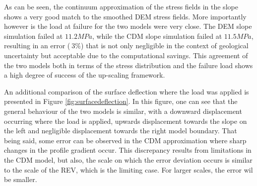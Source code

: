 As can be seen, the continuum approximation of the stress fields in the slope shows a very good match to the smoothed DEM stress fields. More importantly however is the load at failure for the two models were very close. The DEM slope simulation failed at $11.2 MPa$, while the CDM slope simulation failed at $11.5 MPa$, resulting in an error ($~3\%$) that is not only negligible in the context of geological uncertainty but acceptable due to the computational savings. This agreement of the two models both in terms of the stress distribution and the failure load shows a high degree of success of the up-scaling framework. 

An additional comparison of the surface deflection where the load was applied is presented in Figure \ref{fig:surfacedeflection}. In this figure, one can see that the general behaviour of the two models is similar, with a downward displacement occurring where the load is applied, upwards displacement towards the slope on the left and negligible displacement towards the right model boundary. That being said, some error can be observed in the CDM approximation where sharp changes in the profile gradient occur. This discrepancy results from limitations in the CDM model, but also, the scale on which the error deviation occurs is similar to the scale of the REV, which is the limiting case. For larger scales, the error wil be smaller.
